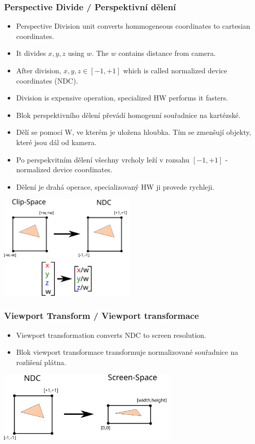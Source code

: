 \begin{frame}
\frametitle{Perspective Divide / Perspektivní dělení}
  \scriptsize
	\begin{itemize}
		\item Perspective Division unit converts hommogeneous coordinates to cartesian coordinates.
    \item It divides $x,y,z$ using $w$. The $w$ contains distance from camera.
    \item After division, $x,y,z \in [-1,+1]$ which is called normalized device coordinates (NDC).
    \item Division is expensive operation, specialized HW performs it fasters.
	\end{itemize}
	\begin{itemize}
		\item Blok perspektivního dělení převádí homogenní souřadnice na kartézské.
    \item Dělí se pomocí W, ve kterém je uložena hloubka. Tím se zmenšují objekty, které jsou dál od kamera.
    \item Po perspekvitním dělení všechny vrcholy leží v rozsahu $[-1,+1]$ - normalized device coordinates.
    \item Dělení je drahá operace, specializovaný HW ji provede rychleji.
	\end{itemize}
	\includegraphics[width=6.5cm,keepaspectratio]{pics/pipeline/PerspectiveDivision}
\end{frame}

\begin{frame}
\frametitle{Viewport Transform / Viewport transformace}
  \scriptsize
	\begin{itemize}
		\item Viewport transformation converts NDC to screen resolution.
	\end{itemize}
	\begin{itemize}
		\item Blok viewport transformace transformuje normalizované souřadnice na rozlišení plátna.
	\end{itemize}
	\includegraphics[width=8.5cm,keepaspectratio]{pics/pipeline/ViewportTransformation}
\end{frame}


